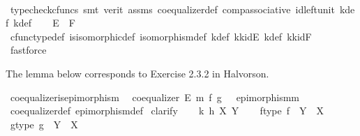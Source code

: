 \begin{isabellebody}
\ \ \ \ \isamarkupfalse%
\ {\isacharparenleft}{\kern0pt}typecheck{\isacharunderscore}{\kern0pt}cfuncs{\isacharcomma}{\kern0pt}\ smt\ {\isacharparenleft}{\kern0pt}verit{\isacharparenright}{\kern0pt}\ assms{\isacharparenleft}{\kern0pt}{}{\isacharparenright}{\kern0pt}\ coequalizer{\isacharunderscore}{\kern0pt}def\ comp{\isacharunderscore}{\kern0pt}associative{}\ id{\isacharunderscore}{\kern0pt}left{\isacharunderscore}{\kern0pt}unit{}\ k{\isacharprime}{\kern0pt}{\isacharunderscore}{\kern0pt}def\ k{\isacharunderscore}{\kern0pt}def{\isacharparenright}{\kern0pt}\isanewline
\isanewline
\ \ \isamarkupfalse%
\ {\isachardoublequoteopen}E\ {\isasymcong}\ F{\isachardoublequoteclose}\isanewline
\ \ \ \ \isamarkupfalse%
\ cfunc{\isacharunderscore}{\kern0pt}type{\isacharunderscore}{\kern0pt}def\ is{\isacharunderscore}{\kern0pt}isomorphic{\isacharunderscore}{\kern0pt}def\ isomorphism{\isacharunderscore}{\kern0pt}def\ k{\isacharprime}{\kern0pt}{\isacharunderscore}{\kern0pt}def\ k{\isacharprime}{\kern0pt}k{\isacharunderscore}{\kern0pt}idE\ k{\isacharunderscore}{\kern0pt}def\ kk{\isacharprime}{\kern0pt}{\isacharunderscore}{\kern0pt}idF\ \isamarkupfalse%
\ fastforce\isanewline
{}\isamarkupfalse%
%
\endisatagproof
{\isafoldproof}%
%
\isadelimproof
%
\endisadelimproof
%
\begin{isamarkuptext}%
The lemma below corresponds to Exercise 2.3.2 in Halvorson.%
\end{isamarkuptext}\isamarkuptrue%
\isamarkupfalse%
\ coequalizer{\isacharunderscore}{\kern0pt}is{\isacharunderscore}{\kern0pt}epimorphism{\isacharcolon}{\kern0pt}\isanewline
\ \ {\isachardoublequoteopen}coequalizer\ E\ m\ f\ g\ {\isasymLongrightarrow}\ \ epimorphism{\isacharparenleft}{\kern0pt}m{\isacharparenright}{\kern0pt}{\isachardoublequoteclose}\isanewline
%
\isadelimproof
\ \ %
\endisadelimproof
%
\isatagproof
{}\isamarkupfalse%
\ coequalizer{\isacharunderscore}{\kern0pt}def\ epimorphism{\isacharunderscore}{\kern0pt}def\isanewline
{}\isamarkupfalse%
\ clarify\isanewline
\ \ \isamarkupfalse%
\ k\ h\ X\ Y\isanewline
\ \ \isamarkupfalse%
\ f{\isacharunderscore}{\kern0pt}type{\isacharcolon}{\kern0pt}\ {\isachardoublequoteopen}f\ {\isacharcolon}{\kern0pt}\ Y\ {\isasymrightarrow}\ X{\isachardoublequoteclose}\isanewline
\ \ \isamarkupfalse%
\ g{\isacharunderscore}{\kern0pt}type{\isacharcolon}{\kern0pt}\ {\isachardoublequoteopen}g\ {\isacharcolon}{\kern0pt}\ Y\ {\isasymrightarrow}\ X{\isachardoublequoteclose}\isanewline

\end{isabellebody}
